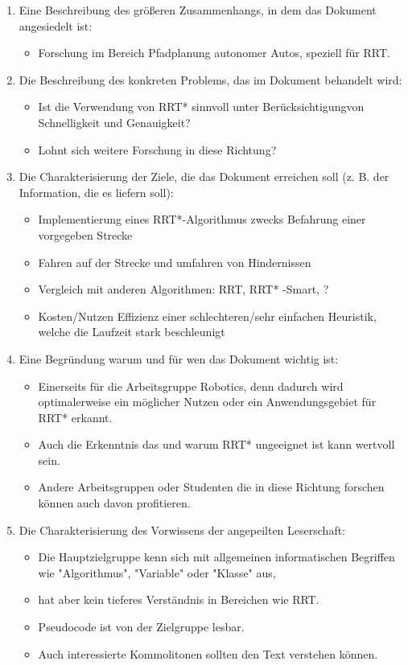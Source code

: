\documentclass[pdftex,a4paper,12pt]{scrartcl}
\begin{document}
	\begin{enumerate}
	
		\item Eine Beschreibung des größeren Zusammenhangs, in dem das Dokument angesiedelt ist:
		\begin{itemize}
		 \item Forschung im Bereich Pfadplanung autonomer Autos, speziell für RRT.
		\end{itemize}
				
		\item  Die Beschreibung des konkreten Problems, das im Dokument behandelt wird:
		\begin{itemize}
		\item  Ist die Verwendung von RRT* sinnvoll unter Berücksichtigungvon Schnelligkeit und Genauigkeit? 
		\item Lohnt sich weitere Forschung in diese Richtung?
		\end{itemize}		

		\item Die Charakterisierung der Ziele, die das Dokument erreichen soll (z. B. der Information, die es liefern soll):
		\begin{itemize}
		\item Implementierung eines RRT*-Algorithmus zwecks Befahrung einer vorgegeben Strecke
		\item Fahren auf der Strecke und umfahren von Hindernissen
		\item Vergleich mit anderen Algorithmen: RRT, RRT* -Smart, ?
		\item Kosten/Nutzen Effizienz einer schlechteren/sehr einfachen Heuristik, welche die Laufzeit stark beschleunigt
		\end{itemize}
	
		\item Eine Begründung warum und für wen das Dokument wichtig ist:
		\begin{itemize}
		\item Einerseits für die Arbeitsgruppe Robotics, denn dadurch wird optimalerweise ein möglicher Nutzen oder ein Anwendungsgebiet für RRT* erkannt.
		\item Auch die Erkenntnis das und warum RRT* ungeeignet ist kann wertvoll sein. 				\item Andere Arbeitsgruppen oder Studenten die in diese Richtung forschen können auch davon profitieren.
		\end{itemize}
		
		\item Die Charakterisierung des Vorwissens der angepeilten Leserschaft:
		\begin{itemize}
		\item Die Hauptzielgruppe kenn sich mit allgemeinen informatischen Begriffen wie "Algorithmus", "Variable" oder "Klasse" aus,
		\item hat aber kein tieferes Verständnis in Bereichen wie RRT.
		\item  Pseudocode ist von der Zielgruppe lesbar. 
		\item Auch interessierte Kommolitonen sollten den Text verstehen können.
		\end{itemize}
		

\end{enumerate}
\end{document}
